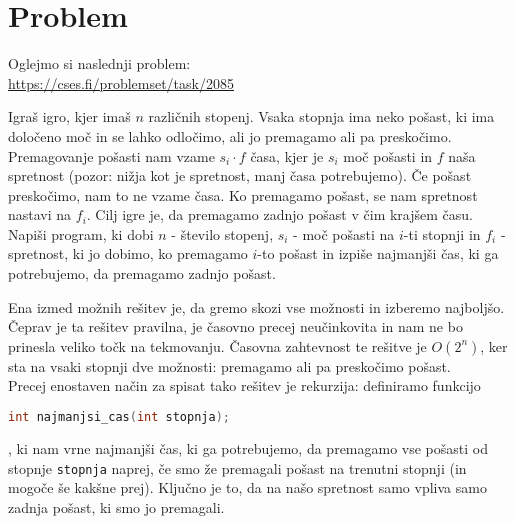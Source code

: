 \section{Problem}\label{sec:problem}
Oglejmo si naslednji problem:\\
\url{https://cses.fi/problemset/task/2085}
\begin{definition}
    Igraš igro, kjer imaš $n$ različnih stopenj.
    Vsaka stopnja ima neko pošast, ki ima določeno moč in se lahko odločimo, ali jo premagamo ali pa preskočimo.
    Premagovanje pošasti nam vzame $s_i \cdot f$ časa, kjer je $s_i$ moč pošasti in $f$ naša spretnost (pozor: nižja kot je spretnost, manj časa potrebujemo).
    Če pošast preskočimo, nam to ne vzame časa.
    Ko premagamo pošast, se nam spretnost nastavi na $f_i$.
    Cilj igre je, da premagamo zadnjo pošast v čim krajšem času.
    Napiši program, ki dobi $n$ - število stopenj, $s_i$ - moč pošasti na $i$-ti stopnji in $f_i$ - spretnost, ki jo dobimo, ko premagamo $i$-to pošast in izpiše najmanjši čas, ki ga potrebujemo, da premagamo zadnjo pošast.
\end{definition}
Ena izmed možnih rešitev je, da gremo skozi vse možnosti in izberemo najboljšo.
Čeprav je ta rešitev pravilna, je časovno precej neučinkovita in nam ne bo prinesla veliko točk na tekmovanju.
Časovna zahtevnost te rešitve je $O(2^n)$, ker sta na vsaki stopnji dve možnosti: premagamo ali pa preskočimo pošast.\\
Precej enostaven način za spisat tako rešitev je rekurzija: definiramo funkcijo
\begin{lstlisting}[label={lst:code1}, language=C++]
int najmanjsi_cas(int stopnja);
\end{lstlisting}
, ki nam vrne najmanjši čas, ki ga potrebujemo, da premagamo vse pošasti od stopnje \texttt{stopnja} naprej, če smo že premagali pošast na trenutni stopnji (in mogoče še kakšne prej).
Ključno je to, da na našo spretnost samo vpliva samo zadnja pošast, ki smo jo premagali.

